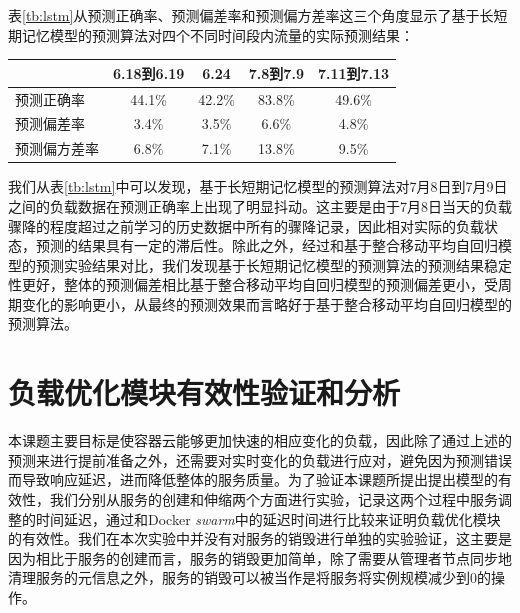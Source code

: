 表\ref{tb:lstm}从预测正确率、预测偏差率和预测偏方差率这三个角度显示了基于长短期记忆模型的预测算法对四个不同时间段内流量的实际预测结果：
\begin{table}[h]
\centering
{}
\begin{tabular}{@{}lcccc@{}}\toprule
  & 6.18到6.19 & 6.24 & 7.8到7.9 & 7.11到7.13 \\ \midrule
 预测正确率 & 44.1\% & 42.2\% & 83.8\% & 49.6\% \\
 预测偏差率 & 3.4\% & 3.5\% & 6.6\% & 4.8\% \\
 预测偏方差率 & 6.8\% & 7.1\% & 13.8\% & 9.5\% \\ \bottomrule
\end{tabular}
\end{table}

我们从表\ref{tb:lstm}中可以发现，基于长短期记忆模型的预测算法对7月8日到7月9日之间的负载数据在预测正确率上出现了明显抖动。这主要是由于7月8日当天的负载骤降的程度超过之前学习的历史数据中所有的骤降记录，因此相对实际的负载状态，预测的结果具有一定的滞后性。除此之外，经过和基于整合移动平均自回归模型的预测实验结果对比，我们发现基于长短期记忆模型的预测算法的预测结果稳定性更好，整体的预测偏差相比基于整合移动平均自回归模型的预测偏差更小，受周期变化的影响更小，从最终的预测效果而言略好于基于整合移动平均自回归模型的预测算法。

\section{负载优化模块有效性验证和分析}
本课题主要目标是使容器云能够更加快速的相应变化的负载，因此除了通过上述的预测来进行提前准备之外，还需要对实时变化的负载进行应对，避免因为预测错误而导致响应延迟，进而降低整体的服务质量。为了验证本课题所提出提出模型的有效性，我们分别从服务的创建和伸缩两个方面进行实验，记录这两个过程中服务调整的时间延迟，通过和Docker \emph{swarm}中的延迟时间进行比较来证明负载优化模块的有效性。我们在本次实验中并没有对服务的销毁进行单独的实验验证，这主要是因为相比于服务的创建而言，服务的销毁更加简单，除了需要从管理者节点同步地清理服务的元信息之外，服务的销毁可以被当作是将服务将实例规模减少到0的操作。

